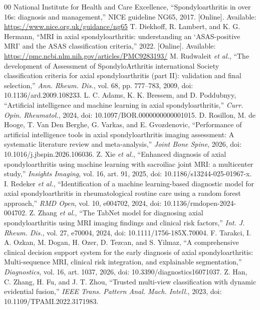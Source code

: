 \documentclass[conference]{IEEEtran}
\begin{document}
\begin{thebibliography}{00}
 National Institute for Health and Care Excellence, ``Spondyloarthritis in over 16s: diagnosis and management,'' NICE guideline NG65, 2017. [Online]. Available: \url{https://www.nice.org.uk/guidance/ng65}
 T. Diekhoff, R. Lambert, and K. G. Hermann, ``MRI in axial spondyloarthritis: understanding an `ASAS-positive MRI' and the ASAS classification criteria,'' 2022. [Online]. Available: \url{https://pmc.ncbi.nlm.nih.gov/articles/PMC9283193/}
 M. Rudwaleit \emph{et al.}, ``The development of Assessment of SpondyloArthritis international Society classification criteria for axial spondyloarthritis (part II): validation and final selection,'' \emph{Ann. Rheum. Dis.}, vol. 68, pp. 777--783, 2009, doi: 10.1136/ard.2009.108233.
 L. C. Adams, K. K. Bressem, and D. Poddubnyy, ``Artificial intelligence and machine learning in axial spondyloarthritis,'' \emph{Curr. Opin. Rheumatol.}, 2024, doi: 10.1097/BOR.0000000000001015.
 D. Rosillon, M. de Hooge, T. Van Den Berghe, G. Varkas, and E. Gvozdenovic, ``Performance of artificial intelligence tools in axial spondyloarthritis imaging assessment: A systematic literature review and meta-analysis,'' \emph{Joint Bone Spine}, 2026, doi: 10.1016/j.jbspin.2026.106036.
 Z. Xie \emph{et al.}, ``Enhanced diagnosis of axial spondyloarthritis using machine learning with sacroiliac joint MRI: a multicenter study,'' \emph{Insights Imaging}, vol. 16, art. 91, 2025, doi: 10.1186/s13244-025-01967-x.
 I. Redeker \emph{et al.}, ``Identification of a machine learning-based diagnostic model for axial spondyloarthritis in rheumatological routine care using a random forest approach,'' \emph{RMD Open}, vol. 10, e004702, 2024, doi: 10.1136/rmdopen-2024-004702.
 Z. Zhang \emph{et al.}, ``The TabNet model for diagnosing axial spondyloarthritis using MRI imaging findings and clinical risk factors,'' \emph{Int. J. Rheum. Dis.}, vol. 27, e70004, 2024, doi: 10.1111/1756-185X.70004.
 F. Tarakci, I. A. Ozkan, M. Dogan, H. Ozer, D. Tezcan, and S. Yilmaz, ``A comprehensive clinical decision support system for the early diagnosis of axial spondyloarthritis: Multi-sequence MRI, clinical risk integration, and explainable segmentation,'' \emph{Diagnostics}, vol. 16, art. 1037, 2026, doi: 10.3390/diagnostics16071037.
 Z. Han, C. Zhang, H. Fu, and J. T. Zhou, ``Trusted multi-view classification with dynamic evidential fusion,'' \emph{IEEE Trans. Pattern Anal. Mach. Intell.}, 2023, doi: 10.1109/TPAMI.2022.3171983.

\end{thebibliography}
\end{document}
